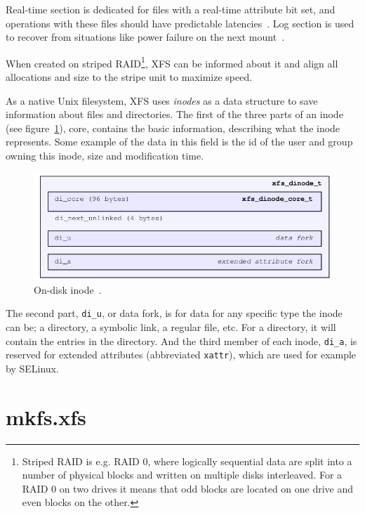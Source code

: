 Real-time section is dedicated for files with a real-time attribute bit set, and operations with these files should have predictable latencies~\cite{xfsRealtime}. Log section is used to recover from situations like power failure on the next mount~\cite{xfsStructure,xfsman}.

When created on striped RAID\footnote{Striped RAID is e.g. RAID 0, where logically sequential data are split into a number of physical blocks and written on multiple disks interleaved. For a RAID 0 on two drives it means that odd blocks are located on one drive and even blocks on the other.}, XFS can be informed about it and align all allocations and size to the stripe unit to maximize speed.

As a native Unix filesystem, XFS uses {\em inodes} as a data structure to save information about files and directories. The first of the three parts of an inode (see figure~\ref{fig:xfs:inode}), core, contains the basic information, describing what the inode represents. Some example of the data in this field is the id of the user and group owning this inode, size and modification time.

\begin{figure}
  \centering
 \includegraphics[width=12cm,keepaspectratio]{fig/inode} %
 \caption{On-disk inode~\cite[Ch. 4]{xfsStructure}.}
\label{fig:xfs:inode}
\end{figure}

The second part, {\tt di\_u}, or data fork, is for data for any specific type the inode can be; a directory, a symbolic link, a regular file, etc. For a directory, it will contain the entries in the directory. And the third member of each inode, {\tt di\_a}, is reserved for extended attributes (abbreviated {\tt xattr}), which are used for example by SELinux.

\section{mkfs.xfs}\label{chap:xfs:mkfs}

